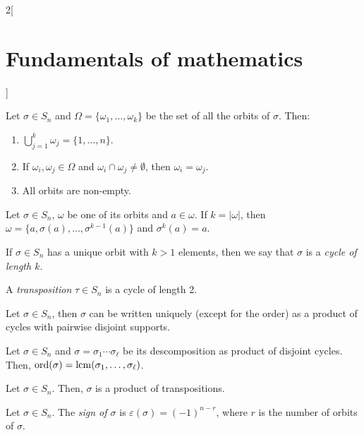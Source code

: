\documentclass[../../../main.tex]{subfiles}
\begin{document}
\begin{multicols}{2}[\section{Fundamentals of mathematics}]
\begin{definition}
    \end{definition}
    \begin{theorem}
        Let $\sigma\in S_n$ and $\Omega=\{\omega_1,\ldots,\omega_k\}$ be the set of all the orbits of $\sigma$. Then:
        \begin{enumerate}
            \item $\bigcup_{j=1}^k \omega_j=\{1,\ldots,n\}$.
            \item If $\omega_i,\omega_j\in\Omega$ and $\omega_i\cap\omega_j\ne\emptyset$, then $\omega_i=\omega_j$.
            \item All orbits are non-empty.
        \end{enumerate}
    \end{theorem}
    \begin{theorem}
        Let $\sigma\in S_n$, $\omega$ be one of its orbits and $a\in\omega$. If $k=|\omega|$, then $\omega=\{a,\sigma(a),\ldots,\sigma^{k-1}(a)\}$ and $\sigma^k(a)=a$.
    \end{theorem}
    \begin{definition}
        If $\sigma\in S_n$ has a unique orbit with $k>1$ elements, then we say that $\sigma$ is a \textit{cycle of length $k$}. 
    \end{definition}
    \begin{definition}
        A \textit{transposition} $\tau\in S_n$ is a cycle of length 2.
    \end{definition}
    \begin{theorem}
        Let $\sigma\in S_n$, then $\sigma$ can be written uniquely (except for the order) as a product of cycles with pairwise disjoint supports.
    \end{theorem}
    \begin{corollary}
        Let $\sigma\in S_n$ and $\sigma=\sigma_1\cdots\sigma_\ell$ be its descomposition as product of disjoint cycles. Then, $\text{ord}(\sigma)=\operatorname{lcm}(\sigma_1,\ldots,\sigma_\ell)$.
    \end{corollary}
    \begin{corollary}
        Let $\sigma\in S_n$. Then, $\sigma$ is a product of transpositions.
    \end{corollary}
    \begin{definition}
        Let $\sigma\in S_n$. The \textit{sign of $\sigma$} is $\varepsilon(\sigma)=(-1)^{n-r}$, where $r$ is the number of orbits of $\sigma$.
    \end{definition}
    \begin{theorem}

\end{theorem}
\end{multicols}
\end{document}
